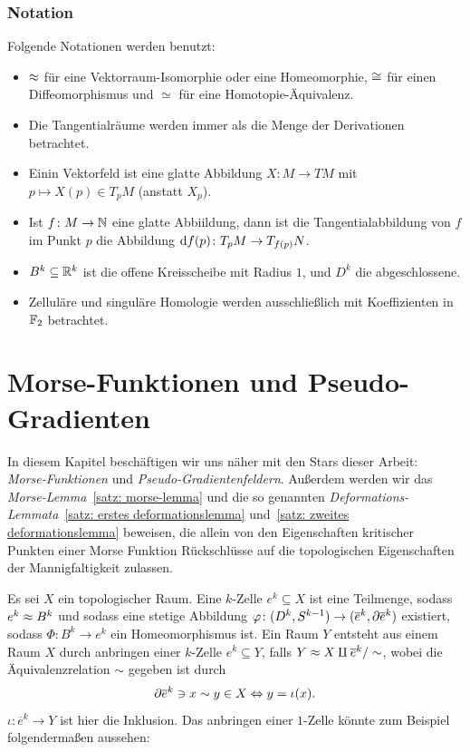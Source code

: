 \documentclass[a4paper,11pt,twoside]{scrreport}
\begin{document}
\subsection*{Notation}

Folgende Notationen werden benutzt:

\begin{itemize}
    \item $\approx$ für eine Vektorraum-Isomorphie oder eine Homeomorphie, $\cong$ für einen Diffeomorphismus
        und $\simeq$ für eine Homotopie-Äquivalenz.
    \item Die Tangentialräume werden immer als die Menge der Derivationen betrachtet.
    \item Einin Vektorfeld ist eine glatte Abbildung $X \colon M \to TM$ mit 
        $p \mapsto X(p) \in T_pM$ (anstatt $X_p$).
    \item Ist $f \colon M \to { \mathbb N }$ eine glatte Abbiildung, dann ist die Tangentialabbildung
        von $f$ im Punkt $p$ die Abbildung ${ \operatorname{d} } f (p) \colon T_pM \to T_{f(p)}N$.
    \item $B^k \subseteq { \mathbb R }^k$ ist die offene Kreisscheibe mit Radius $1$, und $D^k$
        die abgeschlossene.
    \item Zelluläre und singuläre Homologie werden ausschließlich mit Koeffizienten in ${ \mathbb F }_2$ betrachtet.
\end{itemize}

\tableofcontents


\chapter{Morse-Funktionen und Pseudo-Gradienten}

\makeheaderfancy
\setcounter{page}{1}

In diesem Kapitel beschäftigen wir uns näher mit den Stars dieser Arbeit: \\
\textit{Morse-Funktionen} und \textit{Pseudo-Gradientenfeldern}. Außerdem werden wir das 
\textit{Morse-Lem\-ma}~\ref{satz: morse-lemma} und die so genannten 
\textit{Deformations-Lemmata}~\ref{satz: erstes deformationslemma} und~\ref{satz: zweites deformationslemma} 
beweisen, die allein von den Eigenschaften kritischer Punkten einer Morse Funktion 
Rückschlüsse auf die topologischen Eigenschaften der Mannigfaltigkeit zulassen.

Es sei $X$ ein topologischer Raum. Eine $k$-Zelle $e^k \subseteq X$ ist eine Teilmenge, sodass 
$e^k \approx B^k$ und sodass eine stetige Abbildung 
$\varphi \colon (D^k, S^{k - 1}) \to (\overline{e}^k, { \partial } \overline{e}^k)$ existiert, sodass 
$\Phi \colon B^k \to e^k$ ein Homeomorphismus ist. Ein Raum $Y$ entsteht aus einem Raum $X$
durch anbringen einer $k$-Zelle $e^k \subseteq Y$, falls $Y \approx X \amalg \overline{e}^k / \sim$, 
wobei die Äquivalenzrelation $\sim$ gegeben ist durch 
\[ { \partial } \overline{e}^k \ni x \sim y \in X \Leftrightarrow y = \iota (x) . \]
$\iota \colon \overline{e}^k \to Y$ ist hier die Inklusion. Das anbringen einer $1$-Zelle könnte 
zum Beispiel folgendermaßen aussehen:
\end{document}
